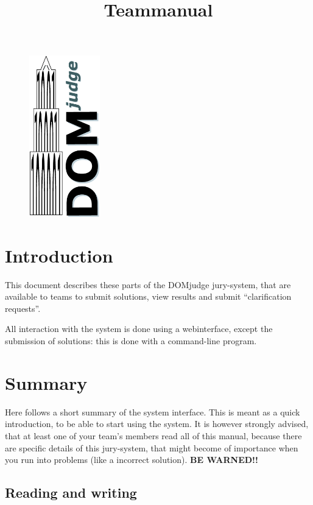\documentclass[11pt,a4paper]{article}
\title{Teammanual \DOMjudge}
\date{\RCSDate}
\newcommand{\DOMjudge}{\textsc{DOM}judge }
\begin{document}
\begin{titlepage}
\maketitle
\vspace{1cm}
\begin{figure}[htbp]
\centerline{\includegraphics[height=7cm]{logos/DOMjudgelogo.eps}}
\end{figure}
\end{titlepage}

\newpage
\tableofcontents

\newpage
\section{Introduction}

This document describes these parts of the \DOMjudge jury-system, that
are available to teams to submit solutions, view results and submit
``clarification requests''.

All interaction with the system is done using a webinterface, except
the submission of solutions: this is done with a command-line program.

\section{Summary}

Here follows a short summary of the system interface. This is meant as
a quick introduction, to be able to start using the system. It is
however strongly advised, that at least one of your team's members
read all of this manual, because there are specific details of this
jury-system, that might become of importance when you run into
problems (like a incorrect solution). \textbf{BE WARNED!!}

\subsection{Reading and writing}
\end{document}
